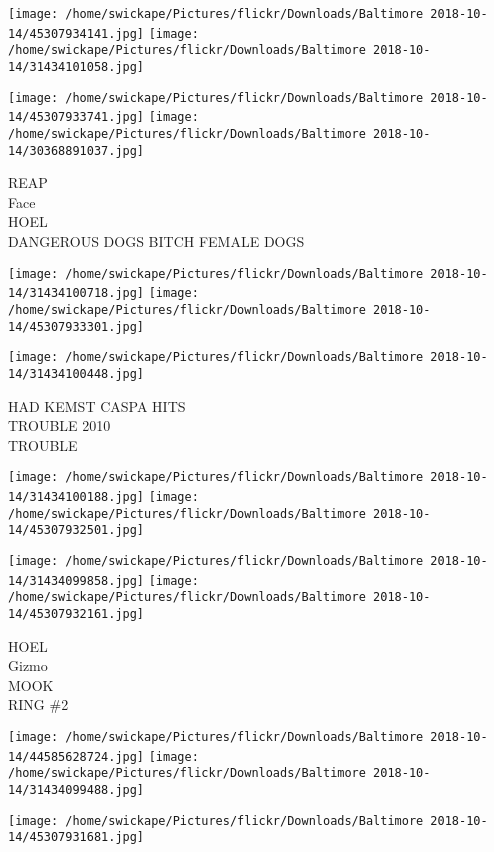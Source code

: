 \documentclass[10pt,letterpaper]{article}
\begin{document}
\texttt{[image: /home/swickape/Pictures/flickr/Downloads/Baltimore 2018-10-14/45307934141.jpg]}
\texttt{[image: /home/swickape/Pictures/flickr/Downloads/Baltimore 2018-10-14/31434101058.jpg]}

\texttt{[image: /home/swickape/Pictures/flickr/Downloads/Baltimore 2018-10-14/45307933741.jpg]}
\texttt{[image: /home/swickape/Pictures/flickr/Downloads/Baltimore 2018-10-14/30368891037.jpg]}

REAP\\
Face\\
HOEL\\
DANGEROUS DOGS BITCH FEMALE DOGS\\
\pagebreak

\texttt{[image: /home/swickape/Pictures/flickr/Downloads/Baltimore 2018-10-14/31434100718.jpg]}
\texttt{[image: /home/swickape/Pictures/flickr/Downloads/Baltimore 2018-10-14/45307933301.jpg]}

\vspace{0.25in}
\texttt{[image: /home/swickape/Pictures/flickr/Downloads/Baltimore 2018-10-14/31434100448.jpg]}

HAD KEMST CASPA HITS\\
TROUBLE 2010\\
TROUBLE\\
\pagebreak

\texttt{[image: /home/swickape/Pictures/flickr/Downloads/Baltimore 2018-10-14/31434100188.jpg]}
\texttt{[image: /home/swickape/Pictures/flickr/Downloads/Baltimore 2018-10-14/45307932501.jpg]}

\texttt{[image: /home/swickape/Pictures/flickr/Downloads/Baltimore 2018-10-14/31434099858.jpg]}
\texttt{[image: /home/swickape/Pictures/flickr/Downloads/Baltimore 2018-10-14/45307932161.jpg]}

HOEL\\
Gizmo\\
MOOK\\
RING \#2\\
\pagebreak

\texttt{[image: /home/swickape/Pictures/flickr/Downloads/Baltimore 2018-10-14/44585628724.jpg]}
\texttt{[image: /home/swickape/Pictures/flickr/Downloads/Baltimore 2018-10-14/31434099488.jpg]}

\texttt{[image: /home/swickape/Pictures/flickr/Downloads/Baltimore 2018-10-14/45307931681.jpg]}
\end{document}
